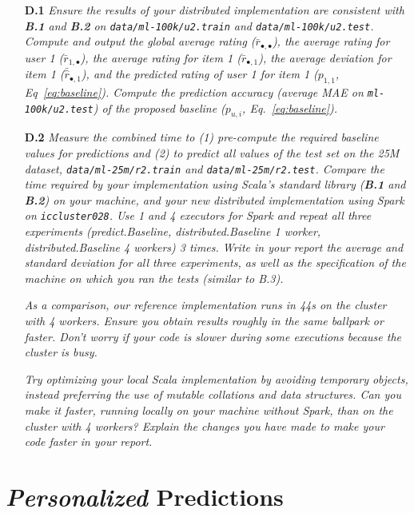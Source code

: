 \documentclass{article}
\begin{document}
\begin{itemize}
  
   \item [\textbf{D.1}] \textit{Ensure the results of your distributed implementation are consistent with \textbf{B.1} and \textbf{B.2} on  \texttt{data/ml-100k/u2.train} and \texttt{data/ml-100k/u2.test}. Compute and output the global average rating ($\bar r_{\bullet,\bullet}$), the average rating for user 1 ($\bar r_{1,\bullet}$),  the average rating for item 1 ($\bar r_{\bullet,1}$), the average deviation for item 1 ($\bar{\hat r}_{\bullet,1}$), and the predicted rating of user 1 for item 1 ($p_{1,1}$, Eq~\ref{eq:baseline}). Compute the prediction accuracy (average MAE on \texttt{ml-100k/u2.test}) of the proposed baseline ($p_{u,i}$, Eq.~\ref{eq:baseline}). } 
  
    \item [\textbf{D.2}] \textit{Measure the combined time to (1) pre-compute the required baseline values for predictions and (2) to predict all values of the test set on the 25M dataset, \texttt{data/ml-25m/r2.train} and \texttt{data/ml-25m/r2.test}. Compare the time required by your implementation using Scala's standard library (\textbf{B.1} and \textbf{B.2}) on your machine, and your new distributed implementation using Spark on \texttt{iccluster028}. Use 1 and 4 executors for Spark and repeat all three experiments (predict.Baseline, distributed.Baseline 1 worker, distributed.Baseline 4 workers) 3 times. Write in your report the average and standard deviation for all three experiments, as well as the specification of the machine on which you ran the tests (similar to B.3).}
    
    \textit{As a comparison, our reference implementation runs in 44s on the cluster with 4 workers. Ensure you obtain results roughly in the same ballpark or faster. Don't worry if your code is slower during some executions because the cluster is busy.}
    
    \textit{Try optimizing your local Scala implementation by avoiding temporary objects, instead preferring the use of mutable collations and data structures. Can you make it faster, running locally on your machine without Spark, than on the cluster with 4 workers? Explain the changes you have made to make your code faster in your report.}
  
\end{itemize}

\section{\textit{Personalized} Predictions}
\end{document}
